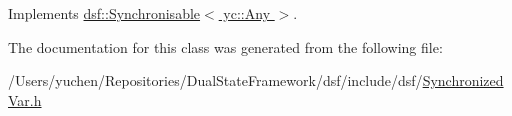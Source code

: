 Implements \hyperlink{classdsf_1_1_synchronisable_a225f9a5f6cb47d73e1ea4d788bbfcaaa}{dsf\+::\+Synchronisable$<$ yc\+::\+Any $>$}.



The documentation for this class was generated from the following file\+:\begin{DoxyCompactItemize}
\item 
/\+Users/yuchen/\+Repositories/\+Dual\+State\+Framework/dsf/include/dsf/\hyperlink{_synchronized_var_8h}{Synchronized\+Var.\+h}\end{DoxyCompactItemize}
